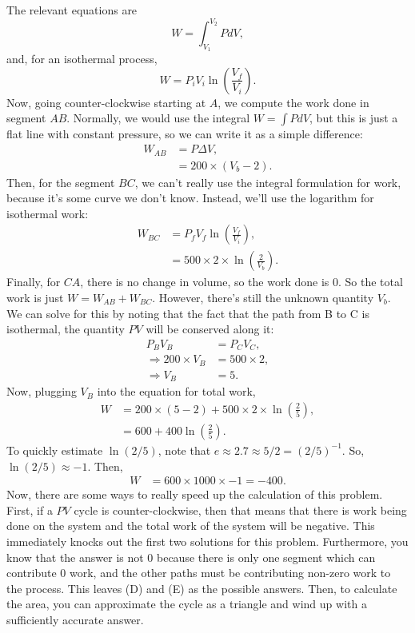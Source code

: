 \documentclass[11pt]{paper}
\begin{document}
The relevant equations are 
\begin{equation}
W = \int_{V_1}^{V_2} P dV,
\end{equation}
and, for an isothermal process,
\begin{equation}
W = P_i V_i \ln\left(\frac{V_f}{V_i}\right).
\end{equation}
Now, going counter-clockwise starting at $A$, we compute the work done in segment $AB$.  Normally, we would use the integral $W = \int P dV$, but this is just a flat line with constant pressure, so we can write it as a simple difference:
\begin{align}
W_{AB} &= P\Delta V,\\
&= 200 \times \left(V_b - 2\right).
\end{align}
Then, for the segment $BC$, we can't really use the integral formulation for work, because it's some curve we don't know.  Instead, we'll use the logarithm for isothermal work:
\begin{align}
W_{BC} &= P_f V_f \ln\left(\frac{V_f}{V_i}\right),\\
&= 500 \times 2 \times \ln \left(\frac{2}{V_b}\right).
\end{align}
Finally, for $CA$, there is no change in volume, so the work done is 0.  So the total work is just $W = W_{AB}+W_{BC}$.  However, there's still the unknown quantity $V_b$.  We can solve for this by noting that the fact that the path from B to C is isothermal, the quantity $PV$ will be conserved along it:
\begin{align}
P_B V_B &= P_C V_C,\\
\Rightarrow 200 \times V_B &= 500 \times 2,\\
\Rightarrow V_B &= 5.
\end{align}
Now, plugging $V_B$ into the equation for total work,
\begin{align}
W &= 200 \times \left(5 - 2\right) + 500 \times 2 \times \ln{\left(\frac{2}{5}\right)}, \\
&= 600 + 400  \ln{\left(\frac{2}{5}\right)}.
\end{align}
To quickly estimate $\ln{\left(2/5\right)}$, note that $e \approx 2.7\approx5/2 = \left(2/5\right)^{-1}$.  So, $\ln{\left(2/5\right)}\approx -1$.  Then,
\begin{align}
W &= 600 \times 1000\times-1 = -400.
\end{align}
Now, there are some ways to really speed up the calculation of this problem.  First, if a $PV$ cycle is counter-clockwise, then that means that there is work being done on the system and the total work of the system will be negative.  This immediately knocks out the first two solutions for this problem.  Furthermore, you know that the answer is not 0 because there is only one segment which can contribute 0 work, and the other paths must be contributing non-zero work to the process.  This leaves (D) and (E) as the possible answers.  Then, to calculate the area, you can approximate the cycle as a triangle and wind up with a sufficiently accurate answer.
\end{document}
